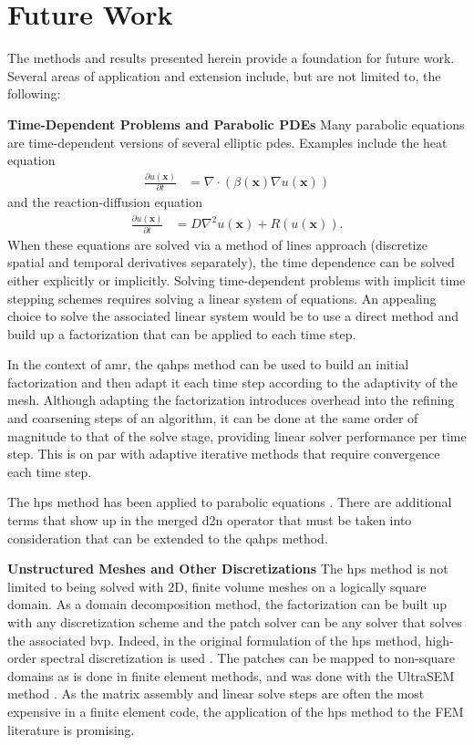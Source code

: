\section{Future Work}
\label{sec:future-work}

The methods and results presented herein provide a foundation for future work. Several areas of application and extension include, but are not limited to, the following:

{\bf Time-Dependent Problems and Parabolic PDEs}
Many parabolic equations are time-dependent versions of several elliptic \gls{pdes}. Examples include the heat equation
\begin{align}
    \frac{\partial u(\textbf{x})}{\partial t} &= \nabla \cdot \left( \beta(\textbf{x}) \nabla u(\textbf{x}) \right)
\end{align}
and the reaction-diffusion equation
\begin{align}
    \frac{\partial u(\textbf{x})}{\partial t} &= D \nabla^2 u(\textbf{x}) + R(u(\textbf{x})).
\end{align}
When these equations are solved via a method of lines approach (discretize spatial and temporal derivatives separately), the time dependence can be solved either explicitly or implicitly. Solving time-dependent problems with implicit time stepping schemes requires solving a linear system of equations. An appealing choice to solve the associated linear system would be to use a direct method and build up a factorization that can be applied to each time step.

In the context of \gls{amr}, the \gls{qahps} method can be used to build an initial factorization and then adapt it each time step according to the adaptivity of the mesh. Although adapting the factorization introduces overhead into the refining and coarsening steps of an algorithm, it can be done at the same order of magnitude to that of the solve stage, providing linear solver performance per time step. This is on par with adaptive iterative methods that require convergence each time step.

The \gls{hps} method has been applied to parabolic equations \citep{babb2018hps}. There are additional terms that show up in the merged \gls{d2n} operator that must be taken into consideration that can be extended to the \gls{qahps} method.

{\bf Unstructured Meshes and Other Discretizations}
The \gls{hps} method is not limited to being solved with 2D, finite volume meshes on a logically square domain. As a domain decomposition method, the factorization can be built up with any discretization scheme and the patch solver can be any solver that solves the associated \gls{bvp}. Indeed, in the original formulation of the \gls{hps} method, high-order spectral discretization is used \citep{gillman2014direct}. The patches can be mapped to non-square domains as is done in finite element methods, and was done with the UltraSEM method \citep{fortunato2020ultraspherical}. As the matrix assembly and linear solve steps are often the most expensive in a finite element code, the application of the \gls{hps} method to the FEM literature is promising.

